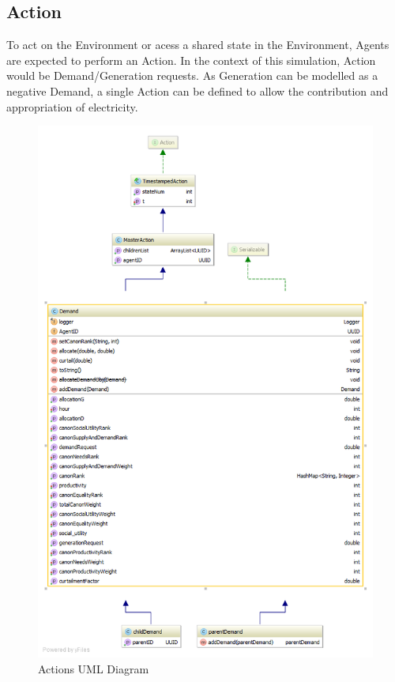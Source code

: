 \subsection*{Action}
To act on the Environment or acess a shared state in the Environment, Agents are expected to perform an Action. In the context of this simulation, Action would be Demand/Generation requests. As Generation can be modelled as a negative Demand, a single Action can be defined to allow the contribution and appropriation of electricity. 

\begin{figure}[!h]
	\centering
	\includegraphics[scale=0.5]{Images/ActionUML.png}
	\caption{Actions UML Diagram}
	\label{fig:ActionUML}
\end{figure}

